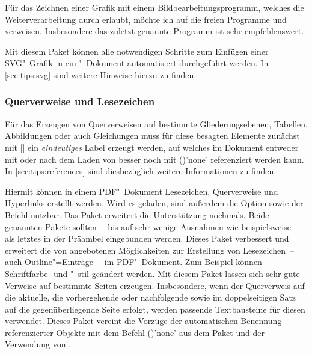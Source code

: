 Für das Zeichnen einer Grafik mit einem Bildbearbeitungsprogramm, welches die 
Weiterverarbeitung durch  erlaubt, möchte ich auf die freien 
Programme  und  verweisen. 
Insbesondere das zuletzt genannte Programm ist sehr empfehlenswert. 

\begin{DeclarePackages}[Grafiken|?]
  Mit diesem Paket können alle notwendigen Schritte zum Einfügen einer 
  SVG"~Grafik in ein "~Dokument automatisiert durchgeführt 
  werden. In \autoref{sec:tips:svg} sind weitere Hinweise hierzu zu finden.%
\end{DeclarePackages}



\subsubsection{%
  Querverweise und Lesezeichen%
}

Für das Erzeugen von Querverweisen auf bestimmte Gliederungsebenen, Tabellen, 
Abbildungen oder auch Gleichungen muss für diese besagten Elemente zunächst mit 
[] ein \emph{eindeutiges} Label erzeugt werden, 
auf welches im Dokument entweder mit  oder nach dem Laden von 
 besser noch mit ()'none' 
referenziert werden kann. In \autoref{sec:tips:references} sind diesbezüglich 
weitere Informationen zu finden.

\begin{DeclarePackages}
  Hiermit können in einem PDF"~Dokument Lesezeichen, Querverweise und 
  Hyperlinks erstellt werden. Wird es geladen, sind außerdem die Option 
   sowie der Befehl  nutzbar. Das 
  Paket  erweitert die Unterstützung nochmals. Beide 
  genannten Pakete sollten~-- bis auf sehr wenige Ausnahmen wie beispielsweise 
  ~-- als letztes in der Präambel eingebunden werden.
  Dieses Paket verbessert und erweitert die von  angebotenen 
  Möglichkeiten zur Erstellung von Lesezeichen~-- auch Outline"=Einträge~-- im 
  PDF"~Dokument. Zum Beispiel können Schriftfarbe- und "~stil geändert werden.
  Mit diesem Paket lassen sich sehr gute Verweise auf bestimmte Seiten 
  erzeugen. Insbesondere, wenn der Querverweis auf die aktuelle, die 
  vorhergehende oder nachfolgende sowie im doppelseitigen Satz auf die 
  gegenüberliegende Seite erfolgt, werden passende Textbausteine für diesen 
  verwendet.
  Dieses Paket vereint die Vorzüge der automatischen Benennung referenzierter 
  Objekte mit dem Befehl ()'none' aus dem 
  Paket  und der Verwendung von .
\end{DeclarePackages}



